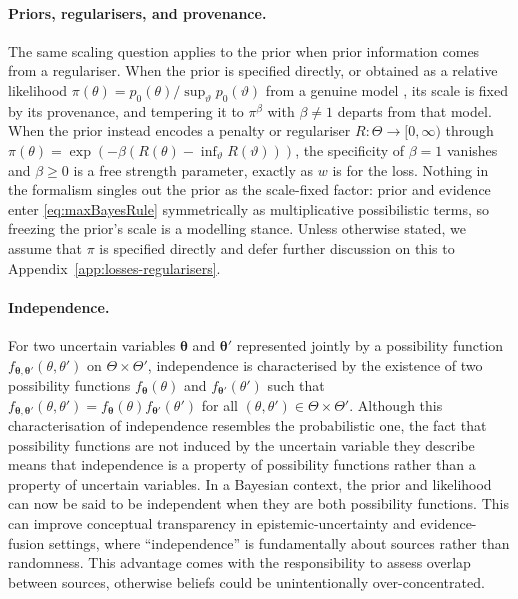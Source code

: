 \documentclass[accepted]{uai2026} %
\theoremstyle{remark}
\begin{document}
\paragraph{Priors, regularisers, and provenance.} The same scaling question applies to the prior when prior information comes from a regulariser. When the prior is specified directly, or obtained as a relative likelihood
$\pi(\theta)=p_0(\theta)/\sup_{\vartheta}p_0(\vartheta)$ from a genuine model
\citep{walley1999upper,denoeux2014likelihood}, its scale is fixed by its provenance, and tempering it to $\pi^\beta$ with $\beta\neq1$ departs from that model. When the prior instead encodes a penalty or regulariser $R:\Theta\to[0,\infty)$ through $\pi(\theta) = \exp(-\beta(R(\theta)-\inf_{\vartheta}R(\vartheta)))$, the specificity of $\beta = 1$ vanishes and $\beta\ge0$ is a free strength parameter, exactly as $w$ is for the loss. Nothing in the formalism singles out the prior as the scale-fixed factor: prior and evidence enter \eqref{eq:maxBayesRule} symmetrically as multiplicative possibilistic terms, so freezing the prior's scale is a modelling stance. Unless otherwise stated, we assume that $\pi$ is specified directly and defer further discussion on this to Appendix~\ref{app:losses-regularisers}.

\paragraph{Independence.} For two uncertain variables $\bm{\theta}$ and $\bm{\theta}'$ represented jointly by a possibility function $f_{\bm{\theta},\bm{\theta}'}(\theta,\theta')$ on $\Theta \times \Theta'$, independence is characterised by the existence of two possibility functions $f_{\bm{\theta}}(\theta)$ and $f_{\bm{\theta}'}(\theta')$ such that $f_{\bm{\theta},\bm{\theta}'}(\theta,\theta') = f_{\bm{\theta}}(\theta)f_{\bm{\theta}'}(\theta')$ for all $(\theta,\theta') \in \Theta \times \Theta'$. Although this characterisation of independence resembles the probabilistic one, the fact that possibility functions are not induced by the uncertain variable they describe means that independence is a property of possibility functions rather than a property of uncertain variables. In a Bayesian context, the prior and likelihood can now be said to be independent when they are both possibility functions. This can improve conceptual transparency in epistemic-uncertainty and evidence-fusion settings, where ``independence'' is fundamentally about sources rather than randomness. This advantage comes with the responsibility to assess overlap between sources, otherwise beliefs could be unintentionally over-concentrated.
\end{document}
